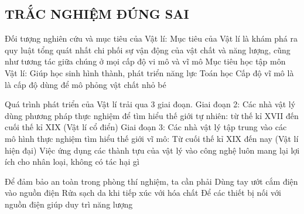 \subsection{TRẮC NGHIỆM ĐÚNG SAI}
\setcounter{ex}{0}
\begin{ex}
	Đối tượng nghiên cứu và mục tiêu của Vật lí:
	{\True Mục tiêu của Vật lí là khám phá ra quy luật tổng quát nhất chi phối sự vận động của vật chất và năng lượng, cũng như tương tác giữa chúng ở mọi cấp độ vi mô và vĩ mô}
	{Mục tiêu học tập môn Vật lí: Giúp học sinh hình thành, phát triển năng lực Toán học}
	{Cấp độ vĩ mô là là cấp độ dùng để mô phỏng vật chất nhỏ bé}
\end{ex}
\begin{ex}
	Quá trình phát triển của Vật lí trải qua 3 giai đoạn.
	{\True Giai đoạn 2: Các nhà vật lý dùng phương pháp thực nghiệm để tìm hiểu thế giới tự nhiên: từ thế kỉ XVII đến cuối thế kỉ XIX (Vật lí cổ điển)}
	{Giai đoạn 3: Các nhà vật lý tập trung vào các mô hình thực nghiệm tìm hiểu thế giới vĩ mô: Từ cuối thế kỉ XIX đến nay (Vật lí hiện đại)}
	{Việc ứng dụng các thành tựu của vật lý vào công nghệ luôn mang lại lợi ích cho nhân loại, không có tác hại gì}
\end{ex}
\begin{ex}
	Để đảm bảo an toàn trong phòng thí nghiệm, ta cần phải
	{Dùng tay ướt cắm điện vào nguồn điện}
	{\True Rửa sạch da khi tiếp xúc với hóa chất}
	{Để các thiết bị nối với nguồn điện giúp duy trì năng lượng}
\end{ex}
